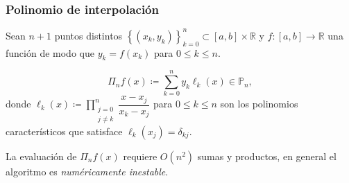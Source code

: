 \begin{frame}
	\frametitle{Polinomio de interpolación}

	Sean $n+1$ puntos distintos
	\begin{math}
		{
			\left\{
			\left(x_{k},y_{k}\right)
			\right\}
		}_{k=0}^{n}\subset
		\left[a,b\right]\times\mathbb{R}
	\end{math}
	y
	\begin{math}
		f\colon\left[a,b\right]\to
		\mathbb{R}
	\end{math}
	una función de modo que
	\begin{math}
		y_{k}=
		f\left(x_{k}\right)
	\end{math}
	para $0\leq k\leq n$.

	\begin{definition}
		\begin{equation*}
			\Pi_{n}
			f\left(x\right)\coloneqq
			\sum\limits_{k=0}^{n}
			y_{k}
			\ell_{k}\left(x\right)\in\mathbb{P}_{n},
		\end{equation*}
		donde
		\begin{math}
			\ell_{k}
			\left(x\right)\coloneq
			\prod\limits_{\substack{j=0\\j\neq k}}^{n}
			\dfrac{x-x_{j}}{x_{k}-x_{j}}
		\end{math}
		para $0\leq k\leq n$ son los \alert{polinomios característicos}
		que satisface
		\begin{math}
			\ell_{k}
			\left(x_{j}\right)=
			\delta_{kj}
		\end{math}.

		La evaluación de $\Pi_{n}f\left(x\right)$ requiere
		$O\left(n^{2}\right)$ sumas y productos, en general el algoritmo
		es \emph{numéricamente inestable}.
	\end{definition}



\end{frame}
